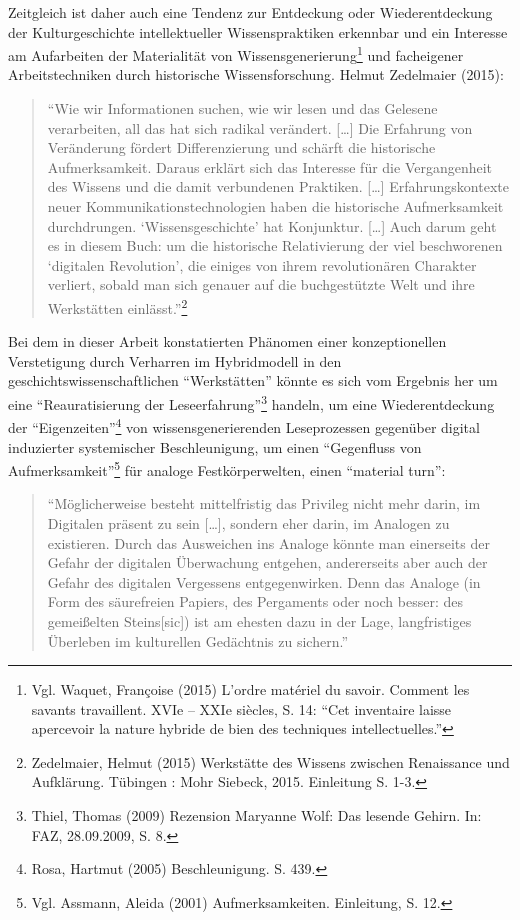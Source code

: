 \documentclass[a4paper,
fontsize=11pt,
oneside,
numbers=noperiodatend,
parskip=half-,
bibliography=totoc,
final
]{scrartcl}
\begin{document}
Zeitgleich ist daher auch eine Tendenz zur Entdeckung oder
Wiederentdeckung der Kulturgeschichte intellektueller Wissenspraktiken
erkennbar und ein Interesse am Aufarbeiten der Materialität von
Wissensgenerierung\footnote{Vgl. Waquet, Françoise (2015) L'ordre
  matériel du savoir. Comment les savants travaillent. XVIe -- XXIe
  siècles, S. 14: \enquote{Cet inventaire laisse apercevoir la nature
  hybride de bien des techniques intellectuelles.}} und facheigener
Arbeitstechniken durch historische Wissensforschung. Helmut Zedelmaier
(2015):

\begin{quote}
\enquote{Wie wir Informationen suchen, wie wir lesen und das Gelesene
verarbeiten, all das hat sich radikal verändert. {[}\ldots{}{]} Die
Erfahrung von Veränderung fördert Differenzierung und schärft die
historische Aufmerksamkeit. Daraus erklärt sich das Interesse für die
Vergangenheit des Wissens und die damit verbundenen Praktiken.
{[}\ldots{}{]} Erfahrungskontexte neuer Kommunikationstechnologien haben
die historische Aufmerksamkeit durchdrungen. \enquote{Wissensgeschichte}
hat Konjunktur. {[}\ldots{}{]} Auch darum geht es in diesem Buch: um die
historische Relativierung der viel beschworenen \enquote{digitalen
Revolution}, die einiges von ihrem revolutionären Charakter verliert,
sobald man sich genauer auf die buchgestützte Welt und ihre Werkstätten
einlässt.}\footnote{Zedelmaier, Helmut (2015) Werkstätte des Wissens
  zwischen Renaissance und Aufklärung. Tübingen : Mohr Siebeck, 2015.
  Einleitung S. 1-3.}
\end{quote}

Bei dem in dieser Arbeit konstatierten Phänomen einer konzeptionellen
Verstetigung durch Verharren im Hybridmodell in den
geschichtswissenschaftlichen \enquote{Werkstätten} könnte es sich vom
Ergebnis her um eine \enquote{Reauratisierung der
Leseerfahrung}\footnote{Thiel, Thomas (2009) Rezension Maryanne Wolf:
  Das lesende Gehirn. In: FAZ, 28.09.2009, S. 8.} handeln, um eine
Wiederentdeckung der \enquote{Eigenzeiten}\footnote{Rosa, Hartmut (2005)
  Beschleunigung. S. 439.} von wissensgenerierenden Leseprozessen
gegenüber digital induzierter systemischer Beschleunigung, um einen
\enquote{Gegenfluss von Aufmerksamkeit}\footnote{Vgl. Assmann, Aleida
  (2001) Aufmerksamkeiten. Einleitung, S. 12.} für analoge
Festkörperwelten, einen \enquote{material turn}:

\begin{quote}
\enquote{Möglicherweise besteht mittelfristig das Privileg nicht mehr
darin, im Digitalen präsent zu sein {[}\ldots{}{]}, sondern eher darin,
im Analogen zu existieren. Durch das Ausweichen ins Analoge könnte man
einerseits der Gefahr der digitalen Überwachung entgehen, andererseits
aber auch der Gefahr des digitalen Vergessens entgegenwirken. Denn das
Analoge (in Form des säurefreien Papiers, des Pergaments oder noch
besser: des gemeißelten Steins{[}sic{]}) ist am ehesten dazu in der
Lage, langfristiges Überleben im kulturellen Gedächtnis zu sichern.}
\end{quote}
\end{document}
